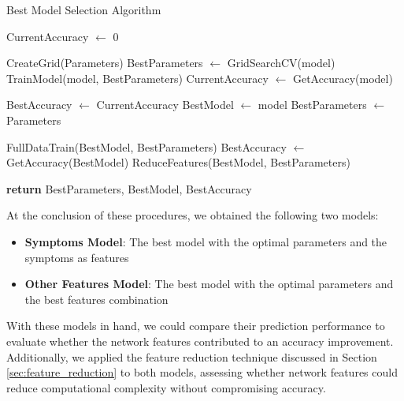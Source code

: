 \begin{algorithm}[H] \small
	\caption{Best Model Selection Algorithm}\label{alg:best_selection}
	
	\begin{algorithmic}[1]
	
	\State CurrentAccuracy $\gets$ 0
	    
	    \State CreateGrid(Parameters)
	    \State BestParameters $\gets$ GridSearchCV(model)
	    \State TrainModel(model, BestParameters)
	    \State CurrentAccuracy $\gets$ GetAccuracy(model)

			\State BestAccuracy $\gets$ CurrentAccuracy
			\State BestModel $\gets$ model
			\State BestParameters $\gets$ Parameters
	    \EndIf

	\EndFor

	\State FullDataTrain(BestModel, BestParameters)
	\State BestAccuracy $\gets$ GetAccuracy(BestModel)
	\State ReduceFeatures(BestModel, BestParameters)
	
	\State \textbf{return} BestParameters, BestModel, BestAccuracy
	\end{algorithmic}
\end{algorithm}


At the conclusion of these procedures, we obtained the following two models:\\

\begin{itemize}
    \setlength\itemsep{0.4em} %
    \item \textbf{Symptoms Model}: The best model with the optimal parameters and the symptoms as features
    \item \textbf{Other Features Model}: The best model with the optimal parameters and the best features combination
\end{itemize}
\vspace{0.4cm}

With these models in hand, we could compare their prediction performance to evaluate whether the network 
features contributed to an accuracy improvement. Additionally, we applied the feature reduction technique discussed 
in Section \ref{sec:feature_reduction} to both models, assessing whether network features could reduce computational 
complexity without compromising accuracy.


